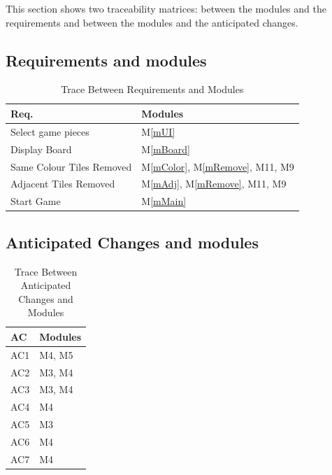 \documentclass[12pt]{article}
\newcommand{\mref}[1]{M\ref{#1}}
\begin{document}
This section shows two traceability matrices: between the modules and the
requirements and between the modules and the anticipated changes.
\subsection{Requirements and modules}
\begin{table}[H]
\centering
\begin{tabular}{p{} p{}}
\toprule
\textbf{Req.} & \textbf{Modules}\\
\midrule
Select game pieces & \mref{mUI}\\
Display Board & \mref{mBoard}\\
Same Colour Tiles Removed & \mref{mColor}, \mref{mRemove}, M11, M9\\
Adjacent Tiles Removed & \mref{mAdj}, \mref{mRemove}, M11, M9\\
Start Game & \mref{mMain}\\

\bottomrule
\end{tabular}
\caption{Trace Between Requirements and Modules}
\label{TblRT}
\end{table}

\subsection{Anticipated Changes and modules}
\begin{table}[H]
\centering
\begin{tabular}{p{} p{}}
\toprule
\textbf{AC} & \textbf{Modules}\\
\midrule
AC1 & M4, M5\\
AC2 & M3, M4\\
AC3 & M3, M4\\
AC4 & M4\\
AC5 & M3\\
AC6 & M4\\
AC7 & M4\\
\bottomrule
\end{tabular}
\caption{Trace Between Anticipated Changes and Modules}
\label{TblRT}
\end{table}
\end{document}
